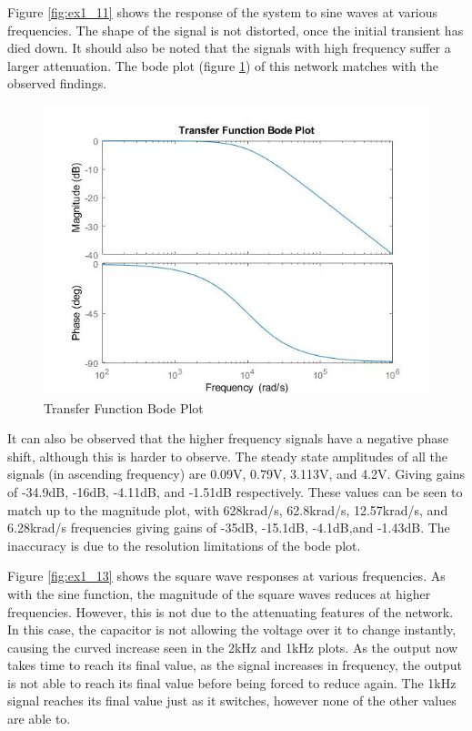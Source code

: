 \documentclass[11pt, oneside, titlepage]{article}   	%
\begin{document}
Figure \ref{fig:ex1_11} shows the response of the system to sine waves at various frequencies. The shape of the signal is not distorted, once the initial transient has died down. It should also be noted that the signals with high frequency suffer a larger attenuation. The bode plot (figure \ref{fig:ex1_12}) of this network matches with the observed findings.

\begin{figure}[H]
\center
\includegraphics[scale = 0.5]{exercise1_12}
\caption{Transfer Function Bode Plot} \label{fig:ex1_12}
\end{figure}

It can also be observed that the higher frequency signals have a negative phase shift, although this is harder to observe. The steady state amplitudes of all the signals (in ascending frequency) are 0.09V,   0.79V, 3.113V, and 4.2V. Giving gains of -34.9dB, -16dB, -4.11dB, and -1.51dB respectively. These values can be seen to match up to the magnitude plot, with 628krad/s, 62.8krad/s, 12.57krad/s, and 6.28krad/s frequencies giving gains of -35dB, -15.1dB, -4.1dB,and -1.43dB. The inaccuracy is due to the resolution limitations of the bode plot. 

Figure \ref{fig:ex1_13} shows the square wave responses at various frequencies. As with the sine function, the magnitude of the square waves reduces at higher frequencies. However, this is not due to the attenuating features of the network. In this case, the capacitor is not allowing the voltage over it to change instantly, causing the curved increase seen in the 2kHz and 1kHz plots. As the output now takes time to reach its final value, as the signal increases in frequency, the output is not able to reach its final value before being forced to reduce again. The 1kHz signal reaches its final value just as it switches, however none of the other values are able to. 
\end{document}
